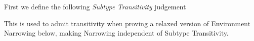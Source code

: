 \documentclass{llncs}
\begin{document}
%


First we define the following \emph{Subtype Transitivity} judgement 
This is used to admit transitivity when proving a relaxed version of
Environment Narrowing below, making Narrowing independent of 
Subtype Transitivity.
\end{document}
